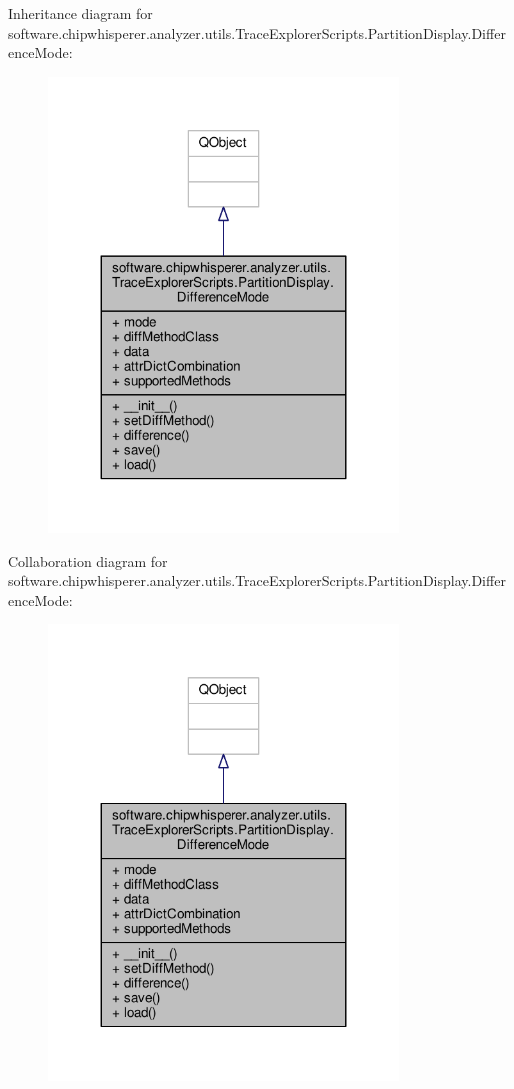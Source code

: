 Inheritance diagram for software.\+chipwhisperer.\+analyzer.\+utils.\+Trace\+Explorer\+Scripts.\+Partition\+Display.\+Difference\+Mode\+:\nopagebreak
\begin{figure}[H]
\begin{center}
\leavevmode
\includegraphics[width=263pt]{d1/d76/classsoftware_1_1chipwhisperer_1_1analyzer_1_1utils_1_1TraceExplorerScripts_1_1PartitionDisplay_d9cfc4fe7015576599921d013f57dc77}
\end{center}
\end{figure}


Collaboration diagram for software.\+chipwhisperer.\+analyzer.\+utils.\+Trace\+Explorer\+Scripts.\+Partition\+Display.\+Difference\+Mode\+:\nopagebreak
\begin{figure}[H]
\begin{center}
\leavevmode
\includegraphics[width=263pt]{df/d69/classsoftware_1_1chipwhisperer_1_1analyzer_1_1utils_1_1TraceExplorerScripts_1_1PartitionDisplay_1_1DifferenceMode__coll__graph}
\end{center}
\end{figure}


